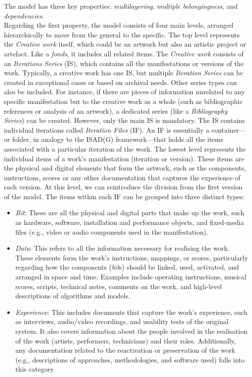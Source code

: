 The model has three key properties: \textit{multilayering}, \textit{multiple belongingness}, and \textit{dependencies}.\\
Regarding the first property, the model consists of four main levels, arranged hierarchically to move from the general to the specific. The top level represents the \textit{Creative work} itself, which could be an artwork but also an artistic project or artefact. Like a \textit{fonds}, it includes all related items. The \textit{Creative work} consists of an \textit{Iterations Series} (IS), which contains all the manifestations or versions of the work. Typically, a creative work has one IS, but multiple \textit{Iteration Series} can be created in exceptional cases or based on archival needs. Other series types can also be included. For instance, if there are pieces of information unrelated to any specific manifestation but to the creative work as a whole (such as bibliographic references or analysis of an artwork), a dedicated series (like a \textit{Bibliography Series}) can be created. However, only the main IS is mandatory. The IS contains individual iterations called \textit{Iteration Files} (IF). An IF is essentially a container—or folder, in analogy to the ISAD(G) framework—that holds all the items associated with a particular iteration of the work. The lowest level represents the individual items of a work's manifestation (iteration or version). These items are the physical and digital elements that form the artwork, such as the components, instructions, scores or any other documentation that captures the experience of each version. At this level, we can reintroduce the division from the first version of the model. The items within each IF can be grouped into three distinct types:
\begin{itemize}
    \item \textit{Bit}: These are all the physical and digital parts that make up the work, such as hardware, software, installation and performance objects, and fixed-media files (e.g., video or audio components used in the manifestation). 
    \item \textit{Data}: This refers to all the information necessary for realising the work. These elements form the work's instructions, mappings, or scores, particularly regarding how the components (\textit{bit}s) should be linked, used, activated, and arranged in space and time. Examples include operating instructions, musical scores, scripts, technical notes, comments on the work, and high-level descriptions of algorithms and models.
    \item \textit{Experience}: This includes documents that capture the work's experience, such as interviews, audio/video recordings, and usability tests of the original system. It also covers information about the people involved in the realisation of the work (artists, performers, technicians) and their roles. Additionally, any documentation related to the reactivation or preservation of the work (e.g., descriptions of approaches, methodologies, and software used) falls into this category.
\end{itemize}
